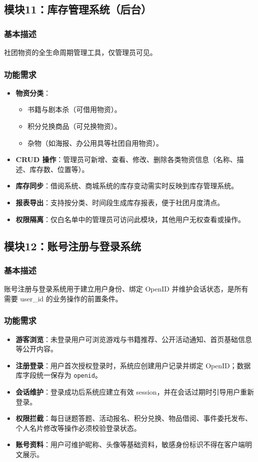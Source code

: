 \documentclass[a4paper,12pt]{article}
\begin{document}
\subsection{模块11：库存管理系统（后台）}
\subsubsection{基本描述}
社团物资的全生命周期管理工具，仅管理员可见。

\subsubsection{功能需求}
\begin{itemize}
    \item \textbf{物资分类}：
        \begin{itemize}
            \item 书籍与剧本杀（可借用物资）。
            \item 积分兑换商品（可兑换物资）。
            \item 杂物（如海报、办公用具等社团自用物资）。
        \end{itemize}
    \item \textbf{CRUD 操作}：管理员可新增、查看、修改、删除各类物资信息（名称、描述、库存数、位置等）。
    \item \textbf{库存同步}：借阅系统、商城系统的库存变动需实时反映到库存管理系统。
    \item \textbf{报表导出}：支持按分类、时间段生成库存报表，便于社团月度清点。
    \item \textbf{权限隔离}：仅白名单中的管理员可访问此模块，其他用户无权查看或操作。
\end{itemize}

\subsection{模块12：账号注册与登录系统}
\subsubsection{基本描述}
账号注册与登录系统用于建立用户身份、绑定 OpenID 并维护会话状态，是所有需要 user\_id 的业务操作的前置条件。

\subsubsection{功能需求}
\begin{itemize}
    \item \textbf{游客浏览}：未登录用户可浏览游戏与书籍推荐、公开活动通知、首页基础信息等公开内容。
    \item \textbf{注册登录}：用户首次授权登录时，系统应创建用户记录并绑定 OpenID；数据库字段统一保存为 \texttt{openid}。
    \item \textbf{会话维护}：登录成功后系统应建立有效 session，并在会话过期时引导用户重新登录。
    \item \textbf{权限拦截}：每日谜题答题、活动报名、积分兑换、物品借阅、事件委托发布、个人名片修改等操作必须校验登录状态。
    \item \textbf{账号资料}：用户可维护昵称、头像等基础资料，敏感身份标识不得在客户端明文展示。
\end{itemize}
\end{document}
